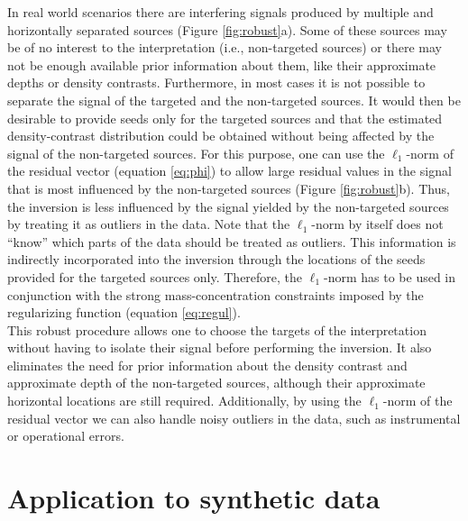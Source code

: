 In real world scenarios there are interfering signals
produced by multiple and horizontally separated sources (Figure
\ref{fig:robust}a).
Some of these sources may be of no interest to the interpretation
(i.e., non-targeted sources) or there may not be enough available prior
information about them, like their approximate depths or density contrasts.
Furthermore, in most cases it is not possible to separate the
signal of the targeted and the non-targeted sources.
It would then be desirable to provide seeds only for the targeted sources and
that the estimated density-contrast distribution could be obtained without
being affected by the signal of the non-targeted sources.
For this purpose, one can use the $\ell_1$-norm of the residual vector
(equation \ref{eq:phi})
to allow large residual values in the signal that is most influenced
by the non-targeted sources (Figure \ref{fig:robust}b).
Thus, the inversion is less influenced by the signal
yielded by the non-targeted sources by treating it as outliers in the data.
Note that the $\ell_1$-norm by itself does not ``know'' which parts of the
data should be treated as outliers.
This information is indirectly incorporated into the inversion through the
locations of the seeds provided for the targeted sources only.
Therefore, the $\ell_1$-norm has to be used in conjunction with the strong
mass-concentration constraints imposed by the regularizing function
(equation \ref{eq:regul}).
\\ \indent
This robust procedure allows one to choose the targets of the interpretation
without having to isolate their signal before performing the inversion.
It also eliminates the need for prior information about the
density contrast and approximate depth of the
non-targeted sources, although their approximate horizontal locations
are still required.
Additionally, by using the $\ell_1$-norm of the residual vector we
can also handle noisy outliers in the data, such as instrumental or operational
errors.


\section{Application to synthetic data}

